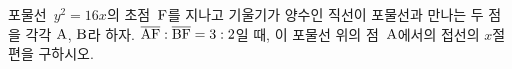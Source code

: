 포물선~$y^2=16x$의 초점~$\mathrm{F}$를 지나고 기울기가 양수인 직선이 포물선과 만나는 두 점을 각각 $\mathrm{A}$, $\mathrm{B}$라 하자. $\overline{\mathrm{AF}}:\overline{\mathrm{BF}}=3:2$일 때, 이 포물선 위의 점~$\mathrm{A}$에서의 접선의 $x$절편을 구하시오.
